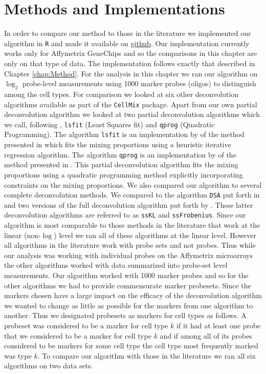 \documentclass[reqno,12pt,oneside]{report}\usepackage[]{graphicx}\usepackage[]{color}
\theoremstyle{plain}
\theoremstyle{definition}
\theoremstyle{remark}
\numberwithin{theorem}{chapter}     %
\begin{document}
\section{Methods and Implementations}
In order to compare our method to those in the literature we implemented our algorithm in \verb+R+ and made it available on \href{https://github.com/gjhunt/deconvolution}{github}. Our implementation currently works only for Affymetrix GeneChips and so the comparisons in this chapter are only on that type of data. The implementation follows exactly that described in Chapter \ref{chap:Method}. For the analysis in this chapter we ran our algorithm on $\log_2$ probe-level measurements using 1000 marker probes (oligos) to distinguish among the cell types. For comparison we looked at six other deconvolution algorithms available as part of the \verb+CellMix+ package. Apart from our own partial deconvolution algorithm we looked at two partial deconvolution algorithms which we call, following \citeauthor{Gaujoux2013}, \verb+lsfit+ (Least Squares fit) and \verb+qprog+ (Quadratic Programming). The algorithm \verb+lsfit+ is an implementation by \citeauthor{Gaujoux2013} of the method presented in \cite{Abbas2009} which fits the mixing proportions using a heuristic iterative regression algorithm. The algorithm \verb+qprog+ is an implementation by \citeauthor{Gaujoux2013} of the method presented in \cite{Gong2011}. This partial deconvolution algorithm fits the mixing proportions using a quadratic programming method explicitly incorporating constraints on the mixing proportions. We also compared our algorithm to several complete deconvolution methods. We compared to the algorithm \verb+DSA+ put forth in \cite{Zhong2013} and two versions of the full deconvolution algorithm put forth by \cite{Gaujoux2012}. These latter deconvolution algorithms are referred to as \verb+ssKL+ and \verb+ssFrobenius+. Since our algorithm is most comparable to those methods in the literature that work at the linear (non-$\log$) level we ran all of these algorithms at the linear level. However all algorithms in the literature work with probe sets and not probes. Thus while our analysis was working with individual probes on the Affymetrix microarrays the other algorithms worked with data summarized into probe-set level measurements. Our algorithm worked with 1000 marker probes and so for the other algorithms we had to provide commensurate marker probesets. Since the markers chosen have a large impact on the efficacy of the deconvolution algorithm we wanted to change as little as possible for the markers from one algorithm to another. Thus we designated probesets as markers for cell types as follows. A probeset was considered to be a marker for cell type $k$ if it had at least one probe that we considered to be a marker for cell type $k$ and if among all of its probes considered to be markers for some cell type the cell type most frequently marked was type $k$. To compare our algorithm with those in the literature we ran all six algorithms on two data sets. 
\end{document}
